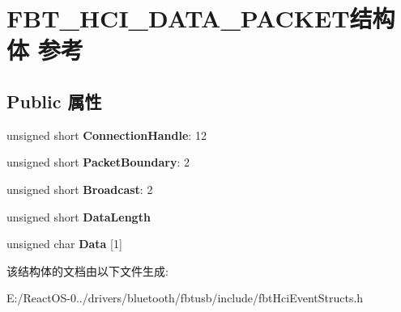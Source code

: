 \hypertarget{struct_f_b_t___h_c_i___d_a_t_a___p_a_c_k_e_t}{}\section{F\+B\+T\+\_\+\+H\+C\+I\+\_\+\+D\+A\+T\+A\+\_\+\+P\+A\+C\+K\+E\+T结构体 参考}
\label{struct_f_b_t___h_c_i___d_a_t_a___p_a_c_k_e_t}
\subsection*{Public 属性}
\begin{DoxyCompactItemize}
\item 
\mbox{\label{struct_f_b_t___h_c_i___d_a_t_a___p_a_c_k_e_t_a0af5bcd063129521f6717955e18dd42d}} 
unsigned short {\bfseries Connection\+Handle}\+: 12
\item 
\mbox{\label{struct_f_b_t___h_c_i___d_a_t_a___p_a_c_k_e_t_ac21dd03ebe6fd537b4d782344b7e0173}} 
unsigned short {\bfseries Packet\+Boundary}\+: 2
\item 
\mbox{\label{struct_f_b_t___h_c_i___d_a_t_a___p_a_c_k_e_t_ae4b66d8a5c555b9637e6b9a3c012b463}} 
unsigned short {\bfseries Broadcast}\+: 2
\item 
\mbox{\label{struct_f_b_t___h_c_i___d_a_t_a___p_a_c_k_e_t_a91b179cbd7a395e5783feaf3853cf42b}} 
unsigned short {\bfseries Data\+Length}
\item 
\mbox{\label{struct_f_b_t___h_c_i___d_a_t_a___p_a_c_k_e_t_a3dccaea2bb08e486452ba81eaba46f7e}} 
unsigned char {\bfseries Data} \mbox{[}1\mbox{]}
\end{DoxyCompactItemize}


该结构体的文档由以下文件生成\+:\begin{DoxyCompactItemize}
\item 
E\+:/\+React\+O\+S-\/0../drivers/bluetooth/fbtusb/include/fbt\+Hci\+Event\+Structs.\+h\end{DoxyCompactItemize}

